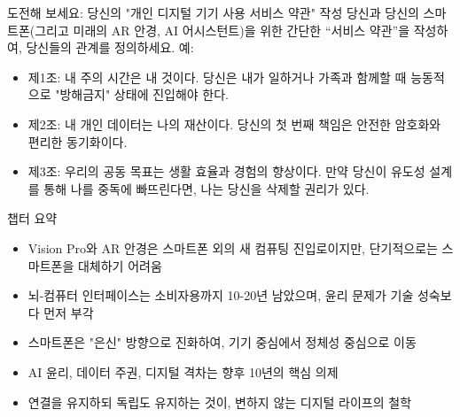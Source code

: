 \begin{tcbpractice}{도전해 보세요: 당신의 "개인 디지털 기기 사용 서비스 약관" 작성}
당신과 당신의 스마트폰(그리고 미래의 AR 안경, AI 어시스턴트)을 위한 간단한 “서비스 약관”을 작성하여, 당신들의 관계를 정의하세요. 예:

\begin{itemize}
  \item 제1조: 내 주의 시간은 내 것이다. 당신은 내가 일하거나 가족과 함께할 때 능동적으로 "방해금지" 상태에 진입해야 한다.
  \item 제2조: 내 개인 데이터는 나의 재산이다. 당신의 첫 번째 책임은 안전한 암호화와 편리한 동기화이다.
  \item 제3조: 우리의 공동 목표는 생활 효율과 경험의 향상이다. 만약 당신이 유도성 설계를 통해 나를 중독에 빠뜨린다면, 나는 당신을 삭제할 권리가 있다.
\end{itemize}

\end{tcbpractice}

\begin{tcbsummary}{챕터 요약}
\begin{itemize}
  \item Vision Pro와 AR 안경은 스마트폰 외의 새 컴퓨팅 진입로이지만, 단기적으로는 스마트폰을 대체하기 어려움
  \item 뇌-컴퓨터 인터페이스는 소비자용까지 10-20년 남았으며, 윤리 문제가 기술 성숙보다 먼저 부각
  \item 스마트폰은 "은신" 방향으로 진화하여, 기기 중심에서 정체성 중심으로 이동
  \item AI 윤리, 데이터 주권, 디지털 격차는 향후 10년의 핵심 의제
  \item 연결을 유지하되 독립도 유지하는 것이, 변하지 않는 디지털 라이프의 철학
\end{itemize}

\end{tcbsummary}
